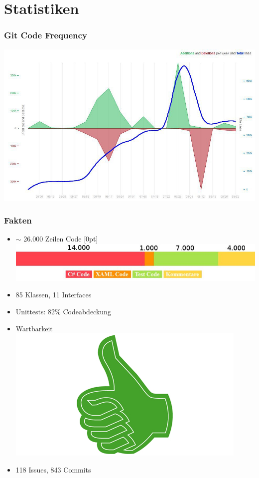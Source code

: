 \documentclass[t]{beamer}
\begin{document}
\section{Statistiken}
\begin{frame}
	\frametitle{Git Code Frequency}
	\includegraphics[scale=.33]{img/GitCodeFrequency.jpg}
\end{frame}
\begin{frame}[c]
	\frametitle{Fakten}
	\begin{itemize}

		\item <+-> \begin{math}\sim\end{math} 26.000 Zeilen Code \raisebox{-1.5cm}[0pt]{\includegraphics[scale=.5]{img/BarDiagramm-Zeilen.jpg}} %
		\item <+-> 85 Klassen, 11 Interfaces
		\item <+-> Unittests: 82\% Codeabdeckung %
		\item <+-> Wartbarkeit
		\includegraphics[scale=.05]{img/DaumenHoch.jpg}
		\item <+-> 118 Issues, 843 Commits 
		\end{itemize}
		
	
\end{frame}
\end{document}
